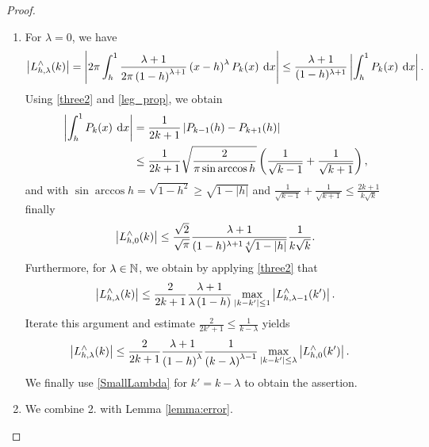 \begin{proof}${}^{}$\\[-3.5ex]
  \begin{enumerate}
  \item For $\lambda=0$, we have
    \begin{equation*}
      \left|L_{h,\lambda}^{\wedge}{\hspace{-0.4ex}}\left(k\right)\right| 
      = \left\vert2\pi \int_{h}^1 \frac{\lambda+1}{2\pi\left(1-h\right)^{\lambda+1}} 
        \left(x-h\right)^{\lambda} P_{k}{\hspace{-0.4ex}}\left(x\right) \: \text{\rm{d}} x\right\vert 
      \le \frac{\lambda+1}{(1-h)^{\lambda+1}}\left\vert\int_{h}^1 P_{k}{\hspace{-0.4ex}}\left(x\right) \: \text{\rm{d}} x\right\vert.
    \end{equation*}
    Using \eqref{three2} and \eqref{leg_prop}, we obtain
    \begin{align*}
      \left\vert\int_{h}^1 P_{k}{\hspace{-0.4ex}}\left(x\right) \: \text{\rm{d}} x\right\vert
      & = \frac{1}{2k+1}
          \left\vert P_{k-1}{\hspace{-0.4ex}}\left(h\right) - P_{k+1}{\hspace{-0.4ex}}\left(h\right)\right\vert\\
      & \le \frac{1}{2k+1} \sqrt{\frac{2}{\pi \sin\arccos h}} \left(\frac{1}{\sqrt{k-1}} + \frac{1}{\sqrt{k+1}}\right),
    \end{align*}
    and with $\sin\arccos h = \sqrt{1-h^2} \ge \sqrt{1-|h|}$ and
    $\frac{1}{\sqrt{k-1}} + \frac{1}{\sqrt{k+1}} \le
    \frac{2k+1}{k\sqrt{k}}$ finally
    \begin{equation}
      \label{SmallLambda}
      \left|L_{h,0}^{\wedge}{\hspace{-0.4ex}}\left(k\right)\right| \le 
      \frac{\sqrt{2}}{\sqrt{\pi}}\frac{\lambda+1}{(1-h)^{\lambda+1}\sqrt[4]{1-|h|}}
      \frac{1}{k\sqrt{k}}.
    \end{equation}
    Furthermore, for $\lambda \in \mathbb{N}$, we obtain by applying \eqref{three2} that
    \begin{equation*}
      \left|L_{h,\lambda}^{\wedge}{\hspace{-0.4ex}}\left(k\right)\right| 
      \le \frac{2}{2k+1} \frac{\lambda+1}{\lambda\left(1-h\right)}
      \max\limits_{|k-k'|\le 1}
      \left|L_{h,\lambda-1}^{\wedge}{\hspace{-0.4ex}}\left(k'\right)\right|.
    \end{equation*}
    Iterate this argument and estimate $\frac{2}{2k'+1}\le
    \frac{1}{k-\lambda}$ yields
    \begin{align*}
      \left|L_{h,\lambda}^{\wedge}{\hspace{-0.4ex}}\left(k\right)\right|
      & \le \frac{2}{2k+1} \frac{\lambda+1}{\left(1-h\right)^{\lambda}}
        \frac{1}{\left(k-\lambda\right)^{\lambda-1}} 
        \max_{|k-k'| \le \lambda} 
        \left\vert L_{h,0}^{\wedge}{\hspace{-0.4ex}}\left(k'\right)\right\vert.
    \end{align*}
    We finally use \eqref{SmallLambda} for $k'=k-\lambda$ to obtain the
    assertion.
  \item We combine 2. with Lemma \ref{lemma:error}. 
  \end{enumerate}
\end{proof}

